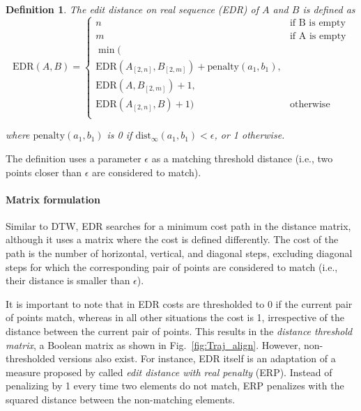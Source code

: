 \documentclass{interact}
\newcommand{\dist}{\ensuremath{\text{dist}}}
\newcommand{\EDR}{\ensuremath{\text{EDR}}}
\newtheorem{definition}{Definition}
\begin{document}
\begin{definition}
The edit distance on real sequence (EDR) of $A$ and $B$ is defined as
\[
\EDR(A,B) =
\left\{
	\begin{array}{ll}
		n  & \mbox{if B is empty} \\
		m  & \mbox{if A is empty} \\
		\min( \\\EDR(A_{[2,n]},B_{[2,m]})+\mbox{penalty}(a_1,b_1), \\
			  \EDR(A,B_{[2,m]}) +1, \\
			\EDR(A_{[2,n]},B)+ 1) & \mbox{otherwise } \\
		\end{array}
\right.
\]

where $\mbox{penalty}(a_1,b_1)$ is 0 if $\dist_\infty(a_1,b_1) < \epsilon $, or 1 otherwise.
\end{definition}
The definition uses a parameter $\epsilon$ as a matching threshold distance (i.e., two points closer than $\epsilon$ are considered to match).
\paragraph*{Matrix formulation}
Similar to DTW, EDR searches for a minimum cost path in the distance matrix, although it uses a matrix where the cost is defined differently. 
The cost of the path is the number of horizontal, vertical, and diagonal steps, excluding diagonal steps for which the corresponding pair of points are considered to match (i.e., their distance is smaller than $\epsilon$). 


It is important to note that in EDR costs are thresholded to 0 if the current pair of points match, whereas in all other situations the cost is 1, irrespective of the distance between the current pair of points. This results in the \emph{distance threshold matrix}, a Boolean matrix as shown in Fig.~\ref{fig:Traj_align}.
However, non-thresholded versions also exist.
For instance, EDR itself is an adaptation of a measure proposed by \cite{NgC04} called \emph{edit distance with real penalty} (ERP). Instead of penalizing by 1 every time two elements do not match, ERP penalizes with the squared distance between the non-matching elements.
\end{document}
